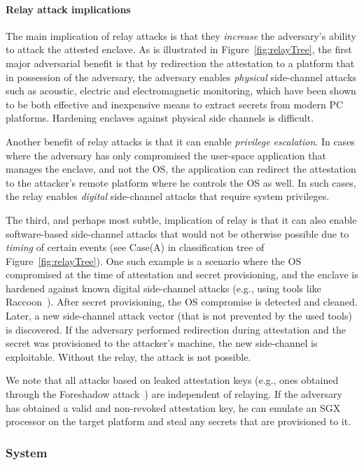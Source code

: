 \paragraph{Relay attack implications}
The main implication of relay attacks is that they \emph{increase} the adversary's ability to attack the attested enclave. As is illustrated in Figure~\ref{fig:relayTree}, the first major adversarial benefit is that by redirection the attestation to a platform that in possession of the adversary, the adversary enables \emph{physical} side-channel attacks such as acoustic, electric and electromagnetic monitoring, which have been shown to be both effective and inexpensive means to extract secrets from modern PC platforms. Hardening enclaves against physical side channels is difficult. 

Another benefit of relay attacks is that it can enable \emph{privilege escalation}. In cases where the adversary has only compromised the user-space application that manages the enclave, and not the OS, the application can redirect the attestation to the attacker's remote platform where he controls the OS as well. In such cases, the relay enables \emph{digital} side-channel attacks that require system privileges.

The third, and perhaps most subtle, implication of relay is that it can also enable software-based side-channel attacks that would not be otherwise possible due to \emph{timing} of certain events (see Case(A) in classification tree of Figure~\ref{fig:relayTree}). One such example is a scenario where the OS compromised at the time of attestation and secret provisioning, and the enclave is hardened against known digital side-channel attacks (e.g., using tools like Raccoon~\cite{raccoon}). After secret provisioning, the OS compromise is detected and cleaned. Later, a new side-channel attack vector (that is not prevented by the used tools) is discovered. If the adversary performed redirection during attestation and the secret was provisioned to the attacker's machine, the new side-channel is exploitable. Without the relay, the attack is not possible.

We note that all attacks based on leaked attestation keys (e.g., ones obtained through the Foreshadow attack~\cite{van2018foreshadow}) are independent of relaying. If the adversary has obtained a valid and non-revoked attestation key, he can emulate an SGX processor on the target platform and steal any secrets that are provisioned to it.


\subsubsection*{\proximitee System}

